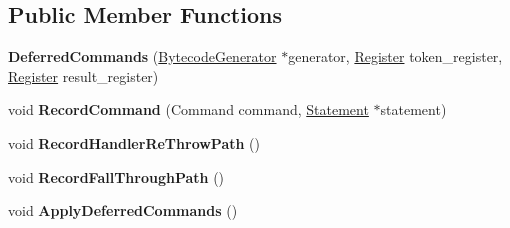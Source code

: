 \subsection*{Public Member Functions}
\begin{DoxyCompactItemize}
\item 
{\bfseries Deferred\+Commands} (\hyperlink{classv8_1_1internal_1_1interpreter_1_1_bytecode_generator}{Bytecode\+Generator} $\ast$generator, \hyperlink{classv8_1_1internal_1_1interpreter_1_1_register}{Register} token\+\_\+register, \hyperlink{classv8_1_1internal_1_1interpreter_1_1_register}{Register} result\+\_\+register)\hypertarget{classv8_1_1internal_1_1interpreter_1_1_bytecode_generator_1_1_control_scope_1_1_deferred_commands_a429f5514b6b66345d3ba4d56b439884e}{}\label{classv8_1_1internal_1_1interpreter_1_1_bytecode_generator_1_1_control_scope_1_1_deferred_commands_a429f5514b6b66345d3ba4d56b439884e}

\item 
void {\bfseries Record\+Command} (Command command, \hyperlink{classv8_1_1internal_1_1_statement}{Statement} $\ast$statement)\hypertarget{classv8_1_1internal_1_1interpreter_1_1_bytecode_generator_1_1_control_scope_1_1_deferred_commands_a549d96991baedce67d01e2d53ee7f3f6}{}\label{classv8_1_1internal_1_1interpreter_1_1_bytecode_generator_1_1_control_scope_1_1_deferred_commands_a549d96991baedce67d01e2d53ee7f3f6}

\item 
void {\bfseries Record\+Handler\+Re\+Throw\+Path} ()\hypertarget{classv8_1_1internal_1_1interpreter_1_1_bytecode_generator_1_1_control_scope_1_1_deferred_commands_a03f1000985f96fdbb4396862185e9ee8}{}\label{classv8_1_1internal_1_1interpreter_1_1_bytecode_generator_1_1_control_scope_1_1_deferred_commands_a03f1000985f96fdbb4396862185e9ee8}

\item 
void {\bfseries Record\+Fall\+Through\+Path} ()\hypertarget{classv8_1_1internal_1_1interpreter_1_1_bytecode_generator_1_1_control_scope_1_1_deferred_commands_a5c0a5c8399b841105103a87bc7356934}{}\label{classv8_1_1internal_1_1interpreter_1_1_bytecode_generator_1_1_control_scope_1_1_deferred_commands_a5c0a5c8399b841105103a87bc7356934}

\item 
void {\bfseries Apply\+Deferred\+Commands} ()\hypertarget{classv8_1_1internal_1_1interpreter_1_1_bytecode_generator_1_1_control_scope_1_1_deferred_commands_accf7dbb1bf0ce99ebd137780ea6e8d83}{}\label{classv8_1_1internal_1_1interpreter_1_1_bytecode_generator_1_1_control_scope_1_1_deferred_commands_accf7dbb1bf0ce99ebd137780ea6e8d83}


\end{DoxyCompactItemize}
